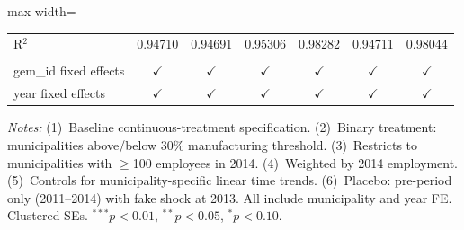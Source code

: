 \begin{table}[htbp]
\begin{adjustbox}{max width=\textwidth}
\begin{tabular}{lcccccc}
      R$^2$                                         & 0.94710         & 0.94691         & 0.95306         & 0.98282         & 0.94711                & 0.98044\\  
       \\
      gem\_id fixed effects                         & $\checkmark$    & $\checkmark$    & $\checkmark$    & $\checkmark$    & $\checkmark$           & $\checkmark$\\   
      year fixed effects                            & $\checkmark$    & $\checkmark$    & $\checkmark$    & $\checkmark$    & $\checkmark$           & $\checkmark$\\   
      \bottomrule
   \end{tabular}
   \end{adjustbox}

   \par \raggedright \footnotesize
   \textit{Notes:} (1)~Baseline continuous-treatment specification. (2)~Binary treatment: municipalities above/below 30\% manufacturing threshold. (3)~Restricts to municipalities with $\geq$100 employees in 2014. (4)~Weighted by 2014 employment. (5)~Controls for municipality-specific linear time trends. (6)~Placebo: pre-period only (2011--2014) with fake shock at 2013. All include municipality and year FE. Clustered SEs. $^{***}p<0.01$, $^{**}p<0.05$, $^{*}p<0.10$.
\end{table}



